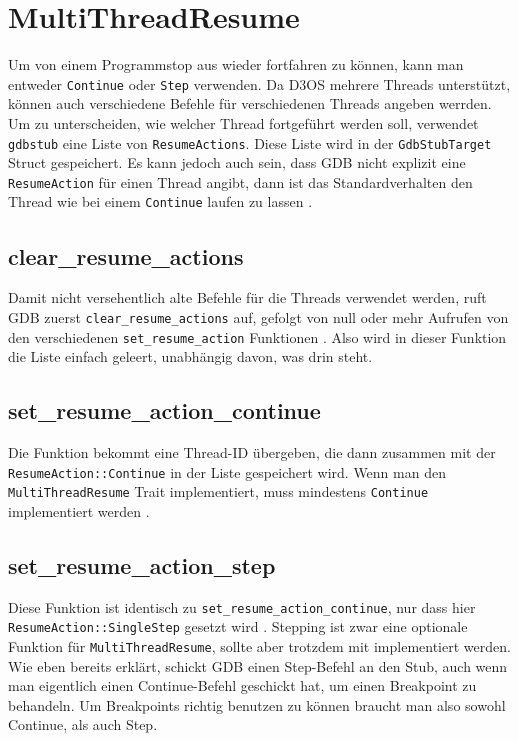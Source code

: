 \section{MultiThreadResume}
Um von einem Programmstop aus wieder fortfahren zu können, kann man entweder \texttt{Continue} oder \texttt{Step} verwenden. Da D3OS mehrere Threads unterstützt, können auch verschiedene Befehle für verschiedenen Threads angeben werrden. Um zu unterscheiden, wie welcher Thread fortgeführt werden soll, verwendet \texttt{gdbstub} eine Liste von \texttt{ResumeActions}. Diese Liste wird in der \texttt {GdbStubTarget} Struct gespeichert. Es kann jedoch auch sein, dass GDB nicht explizit eine \texttt{ResumeAction} für einen Thread angibt, dann ist das Standardverhalten den Thread wie bei einem \texttt{Continue} laufen zu lassen \cite{gdbstub}.

\subsection{clear\_resume\_actions}
Damit nicht versehentlich alte Befehle für die Threads verwendet werden, ruft GDB zuerst \texttt{clear\_resume\_actions} auf, gefolgt von null oder mehr Aufrufen von den verschiedenen \texttt{set\_resume\_action} Funktionen \cite{gdbstub}. Also wird in dieser Funktion die Liste einfach geleert, unabhängig davon, was drin steht.

\subsection{set\_resume\_action\_continue}
Die Funktion bekommt eine Thread-ID übergeben, die dann zusammen mit der \\
\texttt{ResumeAction::Continue} in der Liste gespeichert wird. Wenn man den \texttt{MultiThreadResume} Trait implementiert, muss mindestens \texttt{Continue} implementiert werden \cite{gdbstub}.

\subsection{set\_resume\_action\_step}
Diese Funktion ist identisch zu \texttt{set\_resume\_action\_continue}, nur dass hier \\
\texttt{ResumeAction::SingleStep} gesetzt wird \cite{gdbstub}. Stepping ist zwar eine optionale Funktion für \texttt{MultiThreadResume}, sollte aber trotzdem mit implementiert werden. Wie eben bereits erklärt, schickt GDB einen Step-Befehl an den Stub, auch wenn man eigentlich einen Continue-Befehl geschickt hat, um einen Breakpoint zu behandeln. Um Breakpoints richtig benutzen zu können braucht man also sowohl Continue, als auch Step.

